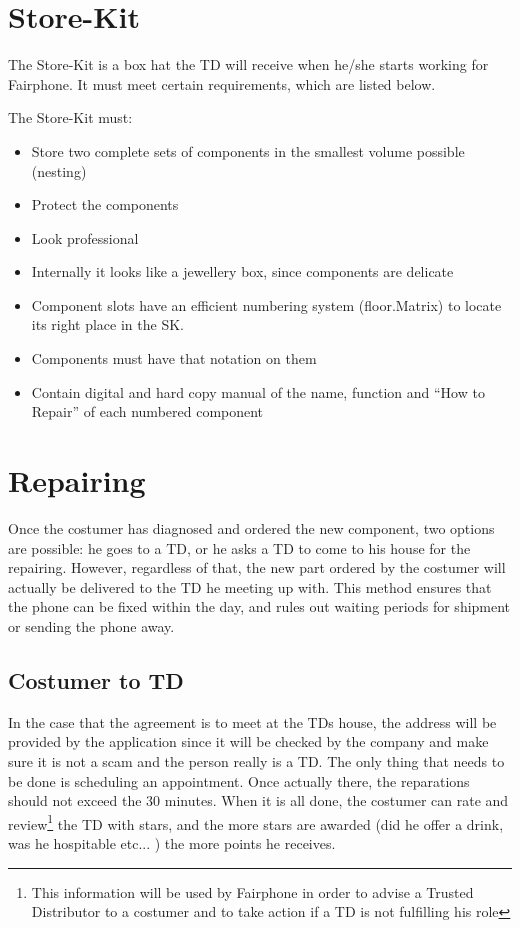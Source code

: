 \documentclass[final,a4paper]{report} %
\begin{document}
\clearpage

\section{Store-Kit}\label{sec:StoreKit}
The Store-Kit is a box hat the TD will receive when he/she starts working for Fairphone. It must meet certain requirements, which are listed below.

The Store-Kit must:
\begin{itemize}
	\item Store two complete sets of components in the smallest volume possible (nesting)
	\item Protect the components
	\item Look professional
	\item Internally it looks like a jewellery box, since components are delicate
	\item Component slots have an efficient numbering system (floor.Matrix) to locate its right place in the SK.
	\item Components must have that notation on them
	\item Contain digital and hard copy manual of the name, function and ``How to Repair'' of each numbered component
\end{itemize}

\section{Repairing}
Once the costumer has diagnosed and ordered the new component, two options are possible: he goes to a TD, or he asks a TD to come to his house for the repairing. However, regardless of that, the new part ordered by the costumer will actually be delivered to the TD he meeting up with. This method ensures that the phone can be fixed within the day, and rules out waiting periods for shipment or sending the phone away.



\subsection{Costumer to TD} \label{subsec:costumer2td}
In the case that the agreement is to meet at the TDs house, the address will be provided by the application since it will be checked by the company and make sure it is not a scam and the person really is a TD. The only thing that needs to be done is scheduling an appointment. Once actually there, the reparations should not exceed the 30 minutes. When it is all done, the costumer can rate and review\footnote{This information will be used by Fairphone in order to advise a Trusted Distributor to a costumer and to take action if a TD is not fulfilling his role} the TD with stars, and the more stars are awarded (did he offer a drink, was he hospitable etc... ) the more points he receives.
\end{document}
